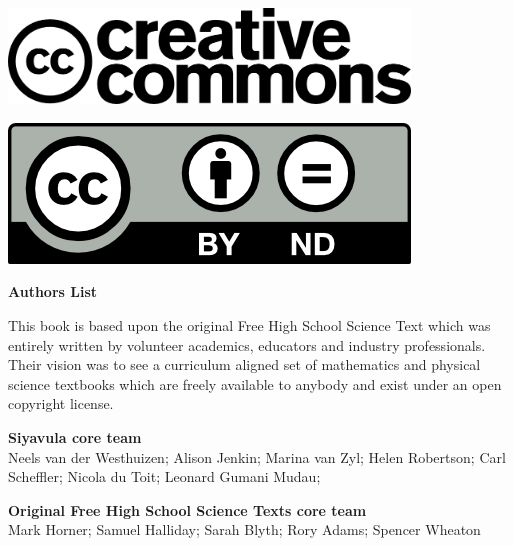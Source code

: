 \vspace*{4in}

\begin{center}
\begin{minipage}{0.6\textwidth}
\includegraphics[width=0.8\textwidth]{title_images/cc2.png}
\end{minipage}
\begin{minipage}{0.3\textwidth}
\includegraphics[width=0.8\textwidth]{title_images/cc1.png}
\end{minipage}
\end{center}

\newpage
\thispagestyle{empty}


\begin{flushleft} \textbf{\huge Authors List} \end{flushleft}

{\LARGE This book is based upon the original Free High School Science Text which was entirely written by
volunteer academics, educators and industry professionals. Their vision was to see a curriculum aligned
set of mathematics and physical science textbooks which are freely available to anybody and exist
under an open copyright license.} \par

\textbf{\LARGE Siyavula core team} \\

Neels van der Westhuizen; Alison Jenkin; Marina van Zyl; Helen Robertson; Carl Scheffler; Nicola du Toit; Leonard Gumani Mudau; \par

\textbf{\LARGE Original Free High School Science Texts core team}\\

Mark Horner; Samuel Halliday; Sarah Blyth; Rory Adams; Spencer Wheaton \par 


